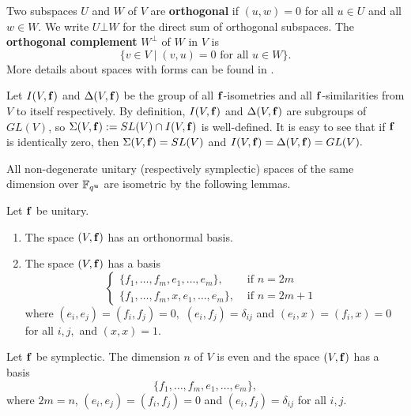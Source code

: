 Two subspaces $U$ and $W$ of $V$ are {\bf orthogonal} if $(u,w)=0$ for all $u \in U$ and all $w \in W.$ We write $U \bot W$ for the direct sum of orthogonal subspaces. The {\bf orthogonal complement } $W^{\bot}$ of $W$ in $V$ is 
$$\{v \in V \mid (v,u)=0 \text{ for all } u \in W \}.$$   More details about spaces with forms can be found in \cite[\S 2.1]{kleidlieb}.
 
 Let $I(V, {\bf f})$ and $\Delta(V, {\bf f})$ be the group of all ${\bf f}$-isometries and all ${\bf f}$-similarities from $V$ to itself respectively. By definition, $I(V, {\bf f})$ and $\Delta(V, {\bf f})$ are subgroups of $GL(V)$, so $\Sigma(V, {\bf f}):=SL(V) \cap I(V, {\bf f})$ is well-defined. It is easy to see that if ${\bf f}$ is identically zero, then $\Sigma(V, {\bf f})=SL(V)$ and $I(V, {\bf f})=\Delta(V, {\bf f})=GL(V).$ 


All non-degenerate unitary (respectively symplectic) spaces of the same dimension over $\mathbb{F}_{q^{\bf u}}$ are isometric by the following lemmas.

\begin{Lem}\label{unibasisl}
Let ${\bf f}$ be unitary.
\begin{enumerate}[font=\normalfont]
\item The space $(V,{\bf f})$ has an orthonormal basis.
\item The space $(V,{\bf f})$ has a basis 
\begin{equation}\label{unibasis}
\begin{cases}
\{f_1, \ldots, f_m, e_1, \ldots, e_m\}, & \text{ if $n=2m$} \\
\{f_1, \ldots, f_m, x, e_1, \ldots, e_m\}, & \text{ if $n=2m+1$ }
\end{cases}
\end{equation}
where $(e_i,e_j)=(f_i,f_j)=0,$ $(e_i,f_j)=\delta_{ij}$ and $(e_i,x)=(f_i,x)=0$ for all $i,j,$ 
and $(x,x)=1.$
\end{enumerate}
\end{Lem}

\begin{Lem}\label{sympbasisl}
Let ${\bf f}$ be symplectic.
The dimension $n$ of $V$ is even and the space $(V,{\bf f})$ has a basis 
\begin{equation}\label{sympbasis}
\{f_1, \ldots, f_m, e_1, \ldots, e_m\}, 
\end{equation}
where $2m=n$,  $(e_i,e_j)=(f_i,f_j)=0$ and $(e_i,f_j)=\delta_{ij}$ for all $i,j.$
\end{Lem}

